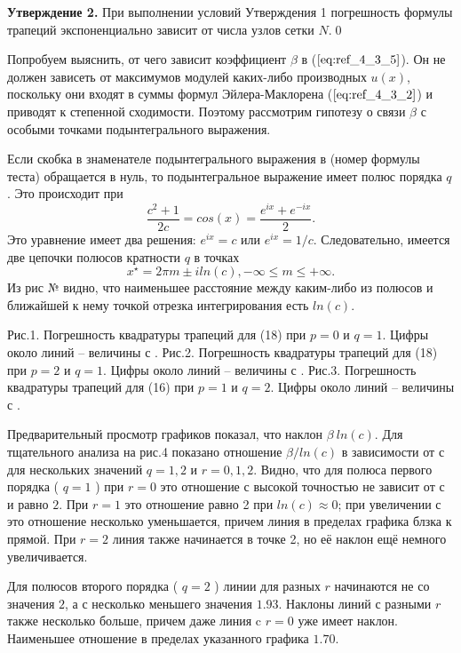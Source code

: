 \textbf{Утверждение 2.} При выполнении условий Утверждения 1 погрешность
формулы трапеций экспоненциально зависит от числа узлов сетки $N$.\qed

Попробуем выяснить, от чего зависит коэффициент $\beta$ в ($\ref{eq:ref_4_3_5}$). Он не
должен зависеть от максимумов модулей каких-либо производных $u(x)$,
поскольку они входят в суммы формул Эйлера-Маклорена ($\ref{eq:ref_4_3_2}$) и приводят к
степенной сходимости. Поэтому рассмотрим гипотезу о связи $\beta$ с особыми точками
подынтегрального выражения.

Если скобка в знаменателе подынтегрального выражения в (номер формулы теста) обращается в нуль, то подынтегральное выражение имеет полюс порядка $q$. Это происходит при
\begin{equation}
\frac{c^{2} + 1}{2c}=cos(x)=\frac{e^{ix}+e^{-ix}}{2}.
\label{eq:ref_4_3_6}
\end{equation}
Это уравнение имеет два решения: $e^{ix}=c$ или $e^{ix}=1/c$. Следовательно, имеется две цепочки полюсов кратности $q$ в точках
\begin{equation}
x^{\star} = 2\pi m \pm iln(c),-\infty \leqslant m \leqslant +\infty.
\label{eq:ref_4_3_7}
\end{equation}
Из рис № видно, что наименьшее расстояние между каким-либо из полюсов и ближайшей к нему
точкой отрезка интегрирования есть $ln(c)$.

Рис.1. Погрешность квадратуры трапеций для (18) при $p = 0$ и $q =1$.
Цифры около линий – величины с .
Рис.2. Погрешность квадратуры трапеций для (18) при $p = 2$ и $q =1$.
Цифры около линий – величины с .
Рис.3. Погрешность квадратуры трапеций для (16) при $p =1$ и $q = 2$.
Цифры около линий – величины с .

Предварительный просмотр графиков показал, что наклон $\beta ~ ln(c)$. Для
тщательного анализа на рис.4 показано отношение $\beta / ln(c)$ в зависимости от $с$
для нескольких значений $q =1,2$ и $r = 0,1,2$. Видно, что для полюса первого
порядка ( $q =1$ ) при $r=0$ это отношение с высокой точностью не зависит от
$с$ и равно $2$. При $r=1$ это отношение равно 2 при $ln(c) \approx 0$; при увеличении с это отношение несколько уменьшается, причем линия в пределах графика блзка к прямой. При $r = 2$ линия также начинается в точке 2, но её наклон ещё немного увеличивается.

Для полюсов второго порядка ( $q = 2$ ) линии для разных $r$ начинаются не со значения $2$, а с несколько меньшего значения $1.93$. Наклоны линий с разными $r$ также несколько больше, причем даже линия c $r=0$ уже имеет наклон. Наименьшее отношение в пределах указанного графика $1.70$.

